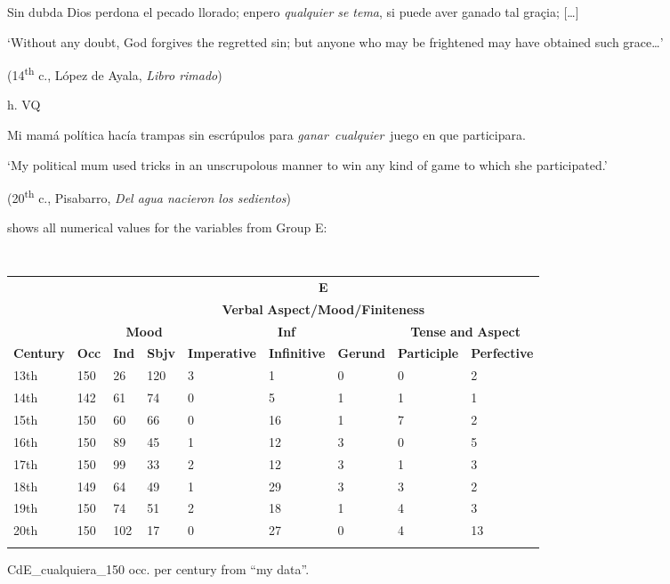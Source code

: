     Sin dubda Dios perdona el pecado llorado; enpero \textit{qualquier} \textit{se tema}, si puede aver ganado tal graçia; […]

    ‘Without any doubt, God forgives the regretted sin; but anyone who may be frightened may have obtained such grace…’

    (14\textsuperscript{th} c., López de Ayala, \textit{Libro rimado})

  h.  VQ

    Mi mamá política hacía trampas sin escrúpulos para \textit{ganar~cualquier}~juego en que participara. 

    ‘My political mum used tricks in an unscrupolous manner to win any kind of game to which she participated.’

    (20\textsuperscript{th} c., Pisabarro, \textit{Del agua nacieron los sedientos})

 shows all numerical values for the variables from Group E:

\begin{table}
\begin{tabularx}{\textwidth}{XXXXXXXXX}
\lsptoprule
\multicolumn{1}{c}{} &  & \multicolumn{7}{c}{ \textbf{E}}\\
\multicolumn{1}{c}{} &  & \multicolumn{7}{c}{ \textbf{Verbal} \textbf{Aspect/Mood/Finiteness}}\\
&  & \multicolumn{2}{c}{ \textbf{Mood}} & \multicolumn{3}{c}{ \textbf{Inf}} & \multicolumn{2}{c}{ \textbf{Tense} \textbf{and} \textbf{Aspect}}\\
 \textbf{Century} & \textbf{Occ} & \textbf{Ind} & \textbf{Sbjv} & \textbf{Imperative} & \textbf{Infinitive} & \textbf{Gerund} & \textbf{Participle} & \textbf{Perfective}\\
 13th & 150 & 26 & 120 & 3 & 1 & 0 & 0 & 2\\
 14th & 142 & 61 & 74 & 0 & 5 & 1 & 1 & 1\\
 15th & 150 & 60 & 66 & 0 & 16 & 1 & 7 & 2\\
 16th & 150 & 89 & 45 & 1 & 12 & 3 & 0 & 5\\
 17th & 150 & 99 & 33 & 2 & 12 & 3 & 1 & 3\\
 18th & 149 & 64 & 49 & 1 & 29 & 3 & 3 & 2\\
 19th & 150 & 74 & 51 & 2 & 18 & 1 & 4 & 3\\
 20th & 150 & 102 & 17 & 0 & 27 & 0 & 4 & 13\\
\lspbottomrule
\end{tabularx}
\caption{\label{tab:} ~}CdE\_cualquiera\_150 occ. per century from “my data”.
\end{table}

